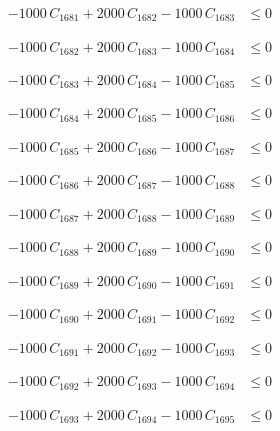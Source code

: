 \documentclass[a4paper,11pt]{article}
\begin{document}
\begin{align}
-1000\,C_{1681} + 2000\,C_{1682} - 1000\,C_{1683} &\leq 0 \nonumber
\end{align}

\begin{align}
-1000\,C_{1682} + 2000\,C_{1683} - 1000\,C_{1684} &\leq 0 \nonumber
\end{align}

\begin{align}
-1000\,C_{1683} + 2000\,C_{1684} - 1000\,C_{1685} &\leq 0 \nonumber
\end{align}

\begin{align}
-1000\,C_{1684} + 2000\,C_{1685} - 1000\,C_{1686} &\leq 0 \nonumber
\end{align}

\begin{align}
-1000\,C_{1685} + 2000\,C_{1686} - 1000\,C_{1687} &\leq 0 \nonumber
\end{align}

\begin{align}
-1000\,C_{1686} + 2000\,C_{1687} - 1000\,C_{1688} &\leq 0 \nonumber
\end{align}

\begin{align}
-1000\,C_{1687} + 2000\,C_{1688} - 1000\,C_{1689} &\leq 0 \nonumber
\end{align}

\begin{align}
-1000\,C_{1688} + 2000\,C_{1689} - 1000\,C_{1690} &\leq 0 \nonumber
\end{align}

\begin{align}
-1000\,C_{1689} + 2000\,C_{1690} - 1000\,C_{1691} &\leq 0 \nonumber
\end{align}

\begin{align}
-1000\,C_{1690} + 2000\,C_{1691} - 1000\,C_{1692} &\leq 0 \nonumber
\end{align}

\begin{align}
-1000\,C_{1691} + 2000\,C_{1692} - 1000\,C_{1693} &\leq 0 \nonumber
\end{align}

\begin{align}
-1000\,C_{1692} + 2000\,C_{1693} - 1000\,C_{1694} &\leq 0 \nonumber
\end{align}

\begin{align}
-1000\,C_{1693} + 2000\,C_{1694} - 1000\,C_{1695} &\leq 0 \nonumber
\end{align}
\end{document}
